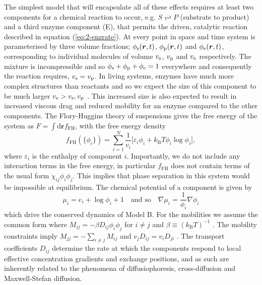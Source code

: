 The simplest model that will encapsulate all of these effects requires at least two components for a chemical reaction to occur, e.g. $S \rightleftharpoons P$ (substrate to product) and a third enzyme component (E), that permits the driven, catalytic reaction described in equation (\ref{eq:2-enzrate}). At every point in space and time system is parameterised by three volume fractions; $\phi_{\mathrm{s}}(\bm{r},t)$, $\phi_{\mathrm{p}}(\bm{r},t)$ and $\phi_{\mathrm{e}}(\bm{r},t)$, corresponding to individual molecules of volume $v_{\mathrm{s}}$, $v_{\mathrm{p}}$ and $v_{\mathrm{e}}$ respectively. The mixture is incompressible and so $\phi_{\mathrm{s}}+\phi_{\mathrm{p}}+\phi_{\mathrm{e}}=1$ everywhere and consequently the reaction requires, $v_{\mathrm{s}} = v_{\mathrm{p}}$. In living systems, enzymes have much more complex structures than reactants and so we expect the size of this component to be much larger $v_{\mathrm{e}} > v_{\mathrm{s}}, v_{\mathrm{p}}$ \cite{berg_biochemistry_2002}. This increased size is also expected to result in increased viscous drag and reduced mobility for an enzyme compared to the other components. The Flory-Huggins theory of suspensions gives the free energy of the system as $F = \int \mathrm{d}\bm{r} f_\mathrm{FH}$, with the free energy density
\begin{equation}
    f_\mathrm{FH}(\{\phi_i\}) = \sum_{i=1}^{N} \frac{1}{v_i} \big[\varepsilon_i\phi_i + k_\mathrm{B}T \phi_i \log\phi_i \big], 
    \label{eq:2-fh_gen}
\end{equation}
where $\varepsilon_i$ is the enthalpy of component $i$. Importantly, we do not include any interaction terms in the free energy, in particular $f_\mathrm{FH}$ does not contain terms of the usual form $\chi_{ij}\phi_i \phi_j$. This implies that phase separation in this system would be impossible at equilibrium. The chemical potential of a component is given by
\begin{equation}
    \mu_i = e_i + \log\phi_i + 1 \quad \text{and so} \quad \nabla\mu_i = \frac{1}{\phi_i}\nabla\phi_i
    \label{eq:2-chempot}
\end{equation}
which drive the conserved dynamics of Model B. For the mobilities we assume the common form where $M_{ij} = -\beta D_{ij}\phi_i\phi_j$ for $i \neq j$ and $\beta \equiv (k_\mathrm{B}T)^{-1}$ \cite{KRAMER1984473}. The mobility constraints imply $M_{jj}= - \sum_{i\neq j} M_{ij}$ and $v_j D_{ij} = v_i D_{ji}$ \cite{kehr_mobility_1989, mao_designing_2020, bo_stochastic_2021}. The transport coefficients $D_{ij}$ determine the rate at which the components respond to local effective concentration gradients and exchange positions, and as such are inherently related to the phenomena of diffusiophoresis, cross-diffusion and Maxwell-Stefan diffusion.

